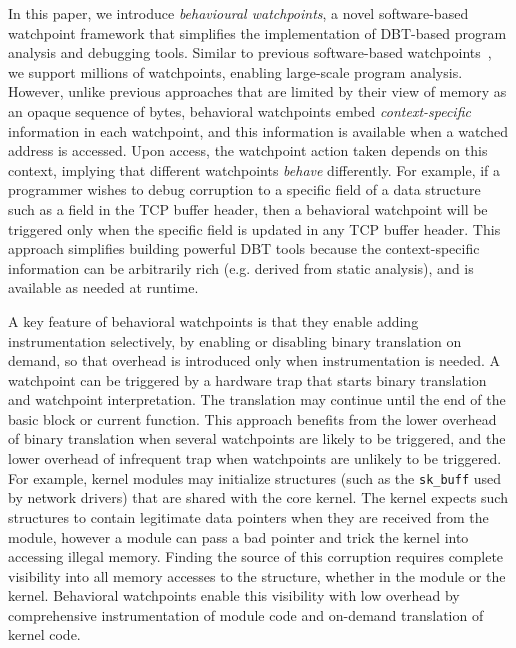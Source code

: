 \documentclass[letterpaper,twocolumn,10pt]{article}
\begin{document}
In this paper, we introduce  \emph{behavioural watchpoints}, a novel software-based watchpoint framework that simplifies the implementation of DBT-based program analysis and debugging tools. Similar to previous software-based watchpoints~\cite{DynamoRIOWatchpoints}, we support millions of watchpoints, enabling large-scale program analysis. However, unlike previous approaches that are limited by their view of memory as an opaque sequence of bytes, behavioral watchpoints embed \emph{context-specific} information in each watchpoint, and this information is available when a watched address is accessed. Upon access, the watchpoint action taken depends on this context, implying that different watchpoints \emph{behave} differently. For example, if a programmer wishes to debug corruption to a specific field of a data structure such as a field in the TCP buffer header, then a behavioral watchpoint will be triggered only when the specific field is updated in any TCP buffer header. This approach simplifies building powerful DBT tools because the context-specific information can be arbitrarily rich (e.g. derived from static analysis), and is available as needed at runtime. 

A key feature of behavioral watchpoints is that they enable adding instrumentation selectively, by enabling or disabling binary translation on demand, so that overhead is introduced only when instrumentation is needed. A watchpoint can be triggered by a hardware trap that starts binary translation and watchpoint interpretation. The translation may continue until the end of the basic block or current function. This approach benefits from the lower overhead of binary translation when several watchpoints are likely to be triggered, and the lower overhead of infrequent trap when watchpoints are unlikely to be triggered. For example, kernel modules may initialize structures (such as the \texttt{sk\_buff} used by network drivers) that are shared with the core kernel. The kernel expects such structures to contain legitimate data pointers when they are received from the module, however a module can pass a bad
pointer and trick the kernel into accessing illegal memory. Finding the source of this corruption requires complete visibility into all memory accesses to the structure, whether in the module or the kernel. Behavioral watchpoints enable this visibility with low overhead by comprehensive instrumentation of module code and on-demand translation of kernel code. %
\end{document}
